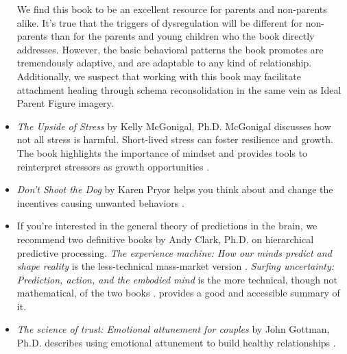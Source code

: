 \documentclass[12pt,letterpaper]{book}
\begin{document}
\begin{itemize}
    We find this book to be an excellent resource for parents and non-parents alike. It's true that the triggers of dysregulation will be different for non-parents than for the parents and young children who the book directly addresses. However, the basic behavioral patterns the book promotes are tremendously adaptive, and are adaptable to any kind of relationship. Additionally, we suspect that working with this book may facilitate attachment healing through schema reconsolidation in the same vein as Ideal Parent Figure imagery.
    \item \textit{The Upside of Stress} by Kelly McGonigal, Ph.D. McGonigal discusses how not all stress is harmful. Short-lived stress can foster resilience and growth. The book highlights the importance of mindset and provides tools to reinterpret stressors as growth opportunities \cite{mcgonigalStress}.
    \item \textit{Don't Shoot the Dog} by Karen Pryor helps you think about and change the incentives causing unwanted behaviors \cite{pryorDog}.
    \item If you're interested in the general theory of predictions in the brain, we recommend two definitive books by Andy Clark, Ph.D. on hierarchical predictive processing. \textit{The experience machine: How our minds predict and shape reality} is the less-technical mass-market version \cite{clark2024experience}. \textit{Surfing uncertainty: Prediction, action, and the embodied mind} is the more technical, though not mathematical, of the two books \cite{clark2015surfing}. \textcite{alexanderSurfing} provides a good and accessible summary of it.
    \item \textit{The science of trust: Emotional attunement for couples} by John Gottman, Ph.D. describes using emotional attunement to build healthy relationships \cite{gottmanTrust}.
\end{itemize}
\printglossaries
{}
\label{sec:glossary}
\appendix
\end{document}
